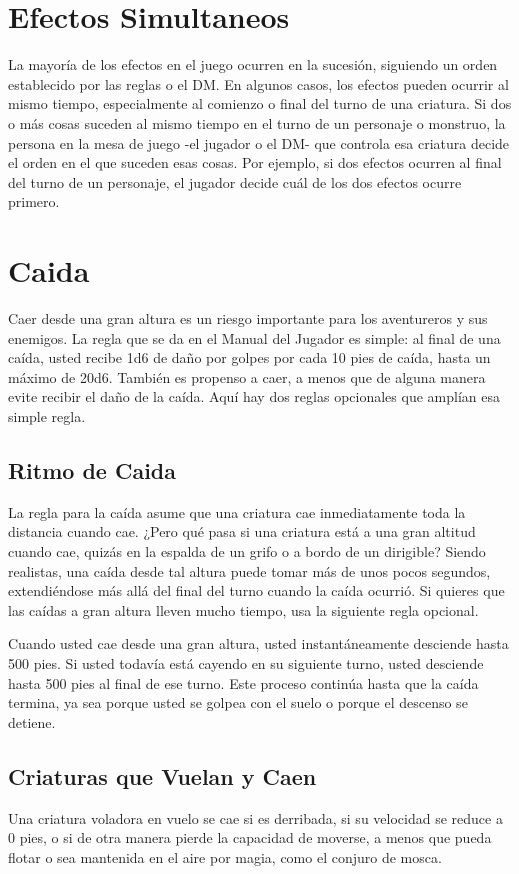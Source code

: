 \documentclass[a4paper,twocolumn,openany,10pt]{dndbook}
\begin{document}
\section{Efectos Simultaneos}
La mayoría de los efectos en el juego ocurren en la sucesión, siguiendo un orden establecido por las reglas o el DM. En algunos
casos, los efectos pueden ocurrir al mismo tiempo, especialmente al comienzo o final del turno de una criatura. Si dos o más cosas
suceden al mismo tiempo en el turno de un personaje o monstruo, la persona en la mesa de juego -el jugador o el DM- que controla
esa criatura decide el orden en el que suceden esas cosas. Por ejemplo, si dos efectos ocurren al final del turno de un personaje,
el jugador decide cuál de los dos efectos ocurre primero. 

\section{Caida}
Caer desde una gran altura es un riesgo importante para los aventureros y sus enemigos. La regla que se da en el Manual del
Jugador es simple: al final de una caída, usted recibe 1d6 de daño por golpes por cada 10 pies de caída, hasta un máximo de 20d6.
También es propenso a caer, a menos que de alguna manera evite recibir el daño de la caída. Aquí hay dos reglas opcionales que
amplían esa simple regla.

\subsection{Ritmo de Caida}
La regla para la caída asume que una criatura cae inmediatamente toda la distancia cuando cae. ¿Pero qué pasa si una criatura está
a una gran altitud cuando cae, quizás en la espalda de un grifo o a bordo de un dirigible? Siendo realistas, una caída desde tal
altura puede tomar más de unos pocos segundos, extendiéndose más allá del final del turno cuando la caída ocurrió. Si quieres que
las caídas a gran altura lleven mucho tiempo, usa la siguiente regla opcional.

Cuando usted cae desde una gran altura, usted instantáneamente desciende hasta 500 pies. Si usted todavía está cayendo en su
siguiente turno, usted desciende hasta 500 pies al final de ese turno. Este proceso continúa hasta que la caída termina, ya sea
porque usted se golpea con el suelo o porque el descenso se detiene. 

\subsection{Criaturas que Vuelan y Caen}
Una criatura voladora en vuelo se cae si es derribada, si su velocidad se reduce a 0 pies, o si de otra manera pierde la capacidad
de moverse, a menos que pueda flotar o sea mantenida en el aire por magia, como el conjuro de mosca.
\end{document}
